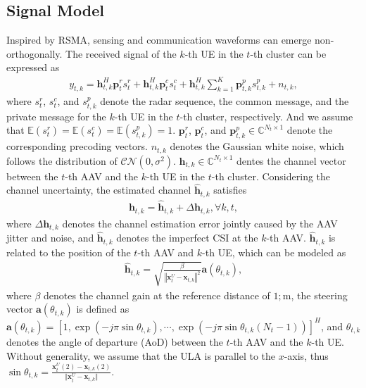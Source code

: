 \documentclass[twocolumn,journal]{IEEEtran}
\begin{document}
\subsection{Signal Model}
Inspired by RSMA, sensing and communication waveforms can emerge non-orthogonally. The received signal of the \(k\)-th UE in the \(t\)-th cluster can be expressed as 
\begin{align}
 y_{t,k} = \boldsymbol{h}^{H}_{t,k}\boldsymbol{p}^{r}_{t} {s}^{r}_{t} + \boldsymbol{h}^{H}_{t,k}\boldsymbol{p}^{c}_{t}{s}^{c}_{t} + \boldsymbol{h}^{H}_{t,k}\sum_{k=1}^{K} \boldsymbol{p}^{p}_{t,k} {s}^{p}_{t,k} + n_{t,k},
\end{align}
where \(s^{r}_{t}\), \(s_{t}^{c}\), and \(s^{p}_{t,k}\) denote the radar sequence, the common message, and the private message for the \(k\)-th UE in the \(t\)-th cluster, respectively. And we assume that \(\mathbb{E}(s^{r}_{t})=\mathbb{E}(s_{t}^{c})=\mathbb{E}(s^{p}_{t,k})=1\). \(\boldsymbol{p}^{r}_{t}\), \(\boldsymbol{p}^{c}_{t}\), and \(\boldsymbol{p}^{p}_{t,k}\in\mathbb{C}^{N_t\times 1}\) denote the corresponding precoding vectors. \(n_{t,k}\) denotes the Gaussian white noise, which follows the distribution of \(\mathcal{CN}(0,\sigma^2)\). \(\boldsymbol{h}_{t,k}\in\mathbb{C}^{N_t \times 1}\) dentes the channel vector between the \(t\)-th AAV and the \(k\)-th UE in the \(t\)-th cluster. Considering the channel uncertainty, the estimated channel \(\hat{\boldsymbol{h}}_{t,k}\) satisfies 
\begin{align}
 \boldsymbol{h}_{t,k} = \hat{\boldsymbol{h}}_{t,k} + \Delta\boldsymbol{h}_{t,k}, \forall k,t,\label{eq:commChannelUncertainty}
\end{align} 
where \(\Delta\boldsymbol{h}_{t,k}\) denotes the channel estimation error jointly caused by the AAV jitter and noise, and \(\hat{\boldsymbol{h}}_{t,k}\) denotes the imperfect CSI at the \(k\)-th AAV. \(\hat{\boldsymbol{h}}_{t,k}\) is related to the position of the \(t\)-th AAV and \(k\)-th UE, which can be modeled as \cite{linMultiAntenna2024}
\begin{align}
 \hat{\boldsymbol{h}}_{t,k} = \sqrt{\frac{\beta}{\left\Vert \boldsymbol{x}^{U}_{t} - \boldsymbol{x}_{t,k} \right\Vert^2}}\boldsymbol{a}(\theta_{t,k}),
\end{align}
where \(\beta\) denotes the channel gain at the reference distance of \(1;\text{m}\), the steering vector \(\boldsymbol{a}(\theta_{t,k})\) is defined as \(\boldsymbol{a}(\theta_{t,k})=[1,\exp(-j\pi\sin\theta_{t,k}),\cdots,\exp(-j\pi\sin\theta_{t,k}(N_t-1))]^H\), and \(\theta_{t,k}\) denotes the angle of departure (AoD) between the \(t\)-th AAV and the \(k\)-th UE. Without generality, we assume that the ULA is parallel to the \(x\)-axis, thus \(\sin\theta_{t,k} = \frac{\boldsymbol{x}^{U}_{t}(2) - \boldsymbol{x}_{t,k}(2)}{\Vert \boldsymbol{x}^{U}_{t} - \boldsymbol{x}_{t,k}\Vert}\).
\end{document}
